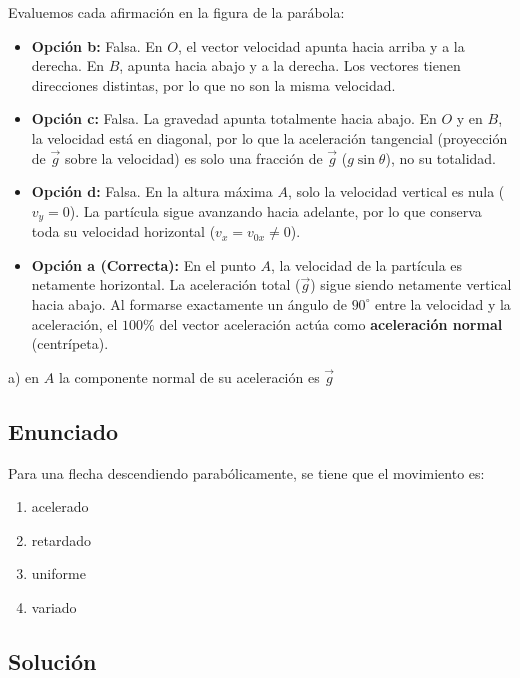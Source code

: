 \documentclass[12pt, a4paper]{article}
\begin{document}
Evaluemos cada afirmación en la figura de la parábola:
\begin{itemize}
    \item \textbf{Opción b:} Falsa. En $O$, el vector velocidad apunta hacia arriba y a la derecha. En $B$, apunta hacia abajo y a la derecha. Los vectores tienen direcciones distintas, por lo que no son la misma velocidad.
    \item \textbf{Opción c:} Falsa. La gravedad apunta totalmente hacia abajo. En $O$ y en $B$, la velocidad está en diagonal, por lo que la aceleración tangencial (proyección de $\vec{g}$ sobre la velocidad) es solo una fracción de $\vec{g}$ ($g\sin\theta$), no su totalidad.
    \item \textbf{Opción d:} Falsa. En la altura máxima $A$, solo la velocidad vertical es nula ($v_y = 0$). La partícula sigue avanzando hacia adelante, por lo que conserva toda su velocidad horizontal ($v_x = v_{0x} \neq 0$).
    \item \textbf{Opción a (Correcta):} En el punto $A$, la velocidad de la partícula es netamente horizontal. La aceleración total ($\vec{g}$) sigue siendo netamente vertical hacia abajo. Al formarse exactamente un ángulo de $90^\circ$ entre la velocidad y la aceleración, el $100\%$ del vector aceleración actúa como \textbf{aceleración normal} (centrípeta).
\end{itemize}

\begin{tcolorbox}[colback=green!5!white, colframe=green!50!black, title=Respuesta Final]
\centering \Large a) en $A$ la componente normal de su aceleración es $\vec{g}$
\end{tcolorbox}

\newpage

\subsection*{Enunciado}
Para una flecha descendiendo parabólicamente, se tiene que el movimiento es:
\begin{enumerate}[label=\alph*)]
    \item acelerado
    \item retardado
    \item uniforme
    \item variado
\end{enumerate}

\subsection*{Solución}
\end{document}

